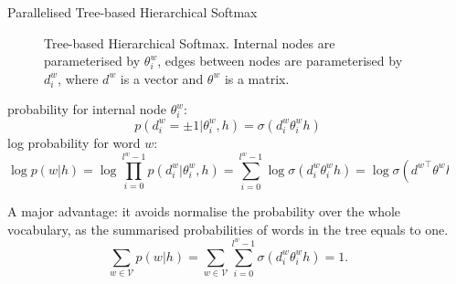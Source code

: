 \documentclass[final,t,unknownkeysallowed]{beamer}
\begin{document}
\begin{frame}{}
\begin{columns}[t]
\begin{column}{.3\linewidth}
      
      \begin{block}{Parallelised Tree-based Hierarchical Softmax}
      \begin{figure}
      \caption{Tree-based Hierarchical Softmax. Internal nodes are parameterised by $\theta_i^w$, edges between nodes are parameterised by $d_i^w$, where $d^w$ is a vector and $\theta^w$ is a matrix.}
      \end{figure}
	probability for internal node $\theta_i^w$:
	\begin{equation}
    p(d^w_i=\pm 1|\theta_{i}^w,h) = \sigma({d_i^w}\theta_{i}^w h)
    \end{equation}
    log probability for word $w$:
    \begin{equation}
    \log p(w|h)=\log\prod_{i=0}^{l^w-1} p(d^w_i|\theta_{i}^w,h) = \sum_{i=0}^{l^w -1} \log\sigma(d_i^w \theta_{i}^w h)=\log\sigma({d^w}^\top \theta^w h)
    \end{equation}
    
    A major advantage: it avoids normalise the probability over the whole vocabulary, as the summarised probabilities of words in the tree equals to one.
\begin{equation}
\sum_{w\in \mathcal{V}}{p(w|h)}=\sum_{w \in \mathcal{V}}\sum_{i=0}^{l^w-1}{\sigma(d_i^w\theta_{i}^w h)}=1.
\end{equation}
    \end{block}
    \end{column}


    \begin{column}{.3\linewidth}
    


\end{column}
\end{columns}
\end{frame}
\end{document}
